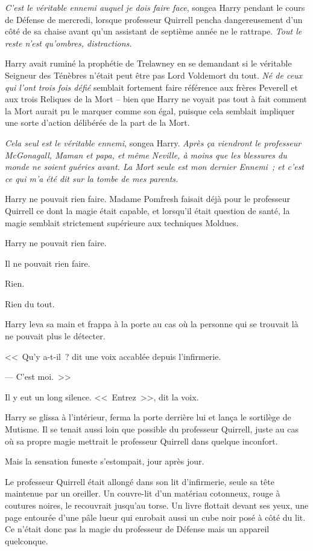 \emph{C'est le véritable ennemi auquel je dois faire face}, songea Harry pendant le cours de Défense de mercredi, lorsque professeur Quirrell pencha dangereusement d'un côté de sa chaise avant qu'un assistant de septième année ne le rattrape. \emph{Tout le reste n'est qu'ombres, distractions.}

Harry avait ruminé la prophétie de Trelawney en se demandant si le véritable Seigneur des Ténèbres n'était peut être pas Lord Voldemort du tout. \emph{Né de ceux qui l'ont trois fois défié} semblait fortement faire référence aux frères Peverell et aux trois Reliques de la Mort -- bien que Harry ne voyait pas tout à fait comment la Mort aurait pu le marquer comme son égal, puisque cela semblait impliquer une sorte d'action délibérée de la part de la Mort.

\emph{Cela seul est le véritable ennemi}, songea Harry. \emph{Après ça viendront le professeur McGonagall, Maman et papa, et même Neville, à moins que les blessures du monde ne soient guéries avant. La Mort seule est mon dernier Ennemi~; et c'est ce qui m'a été dit sur la tombe de mes parents.}

Harry ne pouvait rien faire. Madame Pomfresh faisait déjà pour le professeur Quirrell ce dont la magie était capable, et lorsqu'il était question de santé, la magie semblait strictement supérieure aux techniques Moldues.

Harry ne pouvait rien faire.

Il ne pouvait rien faire.

Rien.

Rien du tout.

\later

Harry leva sa main et frappa à la porte au cas où la personne qui se trouvait là ne pouvait plus le détecter.

<<~Qu'y a-t-il~? dit une voix accablée depuis l'infirmerie.

--- C'est moi.~>>

Il y eut un long silence. <<~Entrez~>>, dit la voix.

Harry se glissa à l'intérieur, ferma la porte derrière lui et lança le sortilège de Mutisme. Il se tenait aussi loin que possible du professeur Quirrell, juste au cas où sa propre magie mettrait le professeur Quirrell dans quelque inconfort.

Mais la sensation funeste s'estompait, jour après jour.

Le professeur Quirrell était allongé dans son lit d'infirmerie, seule sa tête maintenue par un oreiller. Un couvre-lit d'un matériau cotonneux, rouge à coutures noires, le recouvrait jusqu'au torse. Un livre flottait devant ses yeux, une page entourée d'une pâle lueur qui enrobait aussi un cube noir posé à côté du lit. Ce n'était donc pas la magie du professeur de Défense mais un appareil quelconque.

